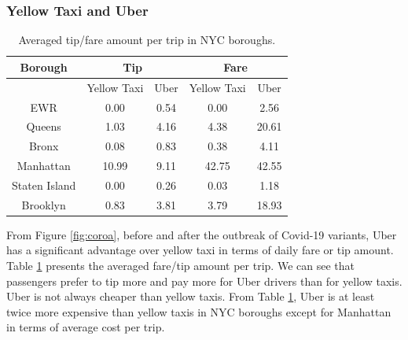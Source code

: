 \documentclass[11pt]{article}
\begin{document}
\subsubsection{Yellow Taxi and Uber}
\begin{table}[]
    \centering
    \begin{tabular}{c|cc|cc}
    \hline
         Borough&  \multicolumn{2}{c}{Tip}& \multicolumn{2}{c}{Fare}\\ 
          \hline
         &Yellow Taxi& Uber&Yellow Taxi& Uber\\
         \hline
         EWR&0.00&0.54&0.00&2.56\\
         Queens&1.03&4.16&4.38&20.61\\
         Bronx&0.08&0.83&0.38&4.11\\
         Manhattan&10.99&9.11&42.75&42.55\\
         Staten Island&0.00&0.26&0.03&1.18\\
         Brooklyn&0.83&3.81&3.79&18.93\\
     \hline
    \end{tabular}
    \caption{Averaged tip/fare amount per trip in NYC boroughs.}
    \label{tab:tip}
\end{table}

From Figure \ref{fig:coroa}, before and after the outbreak of Covid-19 variants, Uber has a significant advantage over yellow taxi in terms of daily fare or tip amount. Table \ref{tab:tip} presents the averaged fare/tip amount per trip. We can see that passengers prefer to tip more and pay more for Uber drivers than for yellow taxis. Uber is not always cheaper than yellow taxis. From Table \ref{tab:tip}, Uber is at least twice more expensive than yellow taxis in NYC boroughs except for Manhattan in terms of average cost per trip.
\end{document}
